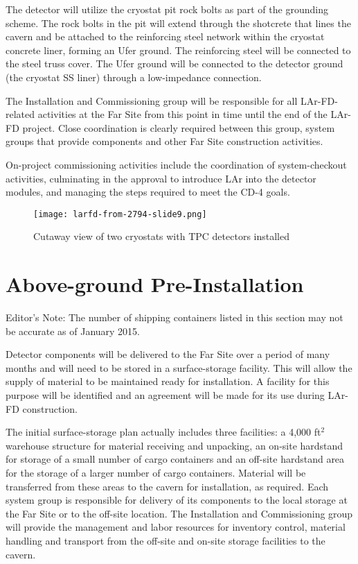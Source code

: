 The detector will utilize the cryostat pit rock bolts as part of the grounding scheme. The rock bolts in the pit will extend through the shotcrete that lines the cavern and be attached to the reinforcing steel network within the cryostat concrete liner, forming an Ufer ground. The reinforcing steel will be connected to the steel truss cover. The Ufer ground will be connected to the detector ground (the cryostat SS liner) through a low-impedance connection.

The Installation and Commissioning group will be responsible for all LAr-FD-related activities at the Far Site from this point in time until the end of the LAr-FD project. Close coordination is clearly required between this group, system groups that provide components and other Far Site construction activities. 

On-project commissioning activities include the coordination of system-checkout activities, culminating in the approval to introduce LAr into the detector modules, and managing the steps required to meet the CD-4 goals. 

\begin{figure}[htpb]
\centering
\texttt{[image: larfd-from-2794-slide9.png]}
\caption{Cutaway view of two cryostats with TPC detectors installed}
\label{fig:tpc-in-two-cryostats}
\end{figure}

\section{Above-ground Pre-Installation}


\begin{editornote}
  Editor's Note:  The number of shipping containers listed in this section may not be accurate as of January 2015.
\end{editornote}


Detector components will be delivered to the Far Site over a period of many months and will need to be stored in a surface-storage facility. This will allow the supply of material to be maintained ready for installation.  A facility for this purpose 
will be identified and an agreement will be made for its use during LAr-FD construction. 

The initial surface-storage plan actually includes three facilities:  a 4,000 ft$^2$ warehouse structure for material receiving and unpacking, an on-site hardstand for storage of a small number of cargo containers and an off-site hardstand area for the storage of 
a larger number of cargo containers. Material will be transferred from these areas to the cavern for installation, as required. Each system group is  
responsible for delivery of  
its components to the local storage at the Far Site or to the off-site location.  
The Installation and Commissioning group will provide the management and labor resources for inventory control, material handling and transport from the off-site and on-site storage facilities to the cavern.

